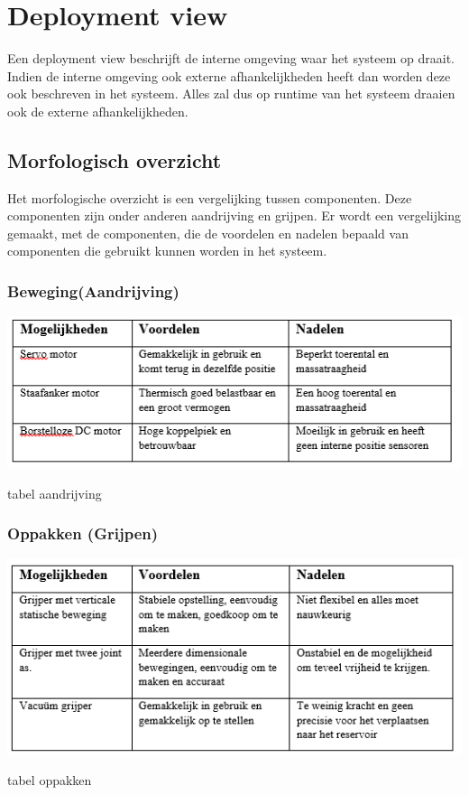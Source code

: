\documentclass[12pt]{article} %
\begin{document}
\newpage%
\section{Deployment view}
\label{sec:Deployment view}
Een deployment view beschrijft de interne omgeving waar het systeem op draait. Indien de interne omgeving ook externe afhankelijkheden heeft dan worden deze ook beschreven in het systeem. Alles zal dus op runtime van het systeem draaien ook de externe afhankelijkheden.

\subsection{Morfologisch overzicht}
Het morfologische overzicht is een vergelijking tussen componenten. Deze componenten zijn onder anderen aandrijving en grijpen. Er wordt een vergelijking gemaakt, met de componenten, die de voordelen en nadelen bepaald van componenten die gebruikt kunnen worden in het systeem.

\subsubsection{Beweging(Aandrijving)}
\begin{center}
\begin{table}[h]
\includegraphics[scale=1.]{tabelAand.png}
\caption{tabel aandrijving}
\label{fig:deployment}
\end{table}
\end{center}
\clearpage

\subsubsection{Oppakken (Grijpen)}
\begin{center}
\begin{table}[h]
\includegraphics[scale=1.]{tabelOppakken.png}
\caption{tabel oppakken}
\label{fig:deployment}
\end{table}
\end{center}
\end{document}
